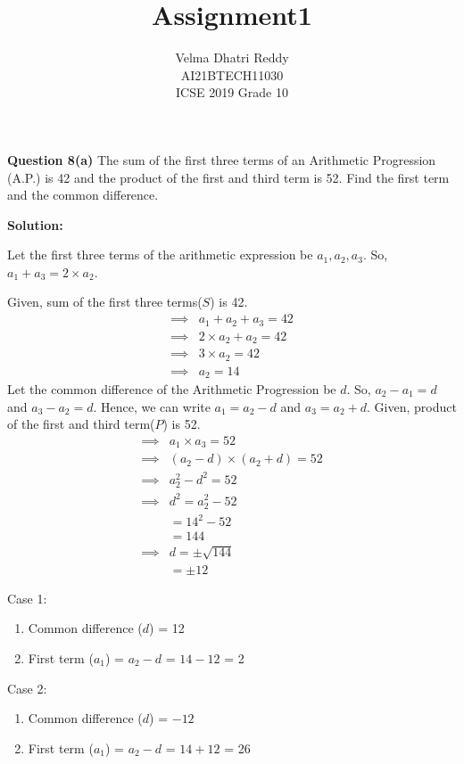 \documentclass[journal,11pt, twocolumn]{IEEEtran}
\title{Assignment1}
\author{Velma Dhatri Reddy \\ \normalsize AI21BTECH11030 \\ \vspace*{10pt} \Large ICSE 2019 Grade 10}
\begin{document}
\maketitle
\textbf{Question 8(a)}
The sum of the first three terms of an Arithmetic Progression (A.P.) is 42 and the product of the first and third term is 52. Find the first term and the common difference.

\textbf{Solution:}

Let the first three terms of the arithmetic expression be $a_1, a_2, a_3$.
So, $a_1 + a_3 = 2\times a_2$.

Given, sum of the first three terms($S$) is 42.
\begin{align}
    \implies
    &a_1 + a_2 + a_3 = 42\\
    \implies
    &2 \times a_2 + a_2 = 42\\
    \implies
    & 3\times a_2 = 42\\
    \implies
    &a_2 = 14
\end{align}
Let the common difference of the Arithmetic Progression be $d$.
So, $a_2 - a_1 = d$ and $a_3 - a_2 = d$.
Hence, we can write $ a_1 = a_2 - d$ and $ a_3 = a_2 + d$.
Given, product of the first and third term($P$) is 52.
\begin{align}
    \implies
    &a_1 \times a_3 = 52\\
    \implies 
    &(a_2 - d) \times (a_2 + d) = 52\\
    \implies
    &a_2^2 - d^2 = 52\\
    \implies
    &d^2 = a_2^2 - 52\\
    &= 14^2 - 52\\
    &= 144\\
    \implies
    &d = \pm \sqrt{144}\\
    &= \pm 12
\end{align}

Case 1:
\begin{enumerate}[label=(\roman*)]
		\item Common difference ($d$) = 12
		\item First term ($a_1$) = $a_2 - d$ = $14 - 12$ = 2
\end{enumerate}

Case 2:
\begin{enumerate}[label=(\roman*)]
		\item Common difference ($d$) = $-12$
		\item First term ($a_1$) = $a_2 - d$ = $14 + 12$ = 26
\end{enumerate}

\begin{table}[ht!]
		
		\vspace*{5pt}
		\caption{}
		\label{table:table1}	
\end{table}
\end{document}
